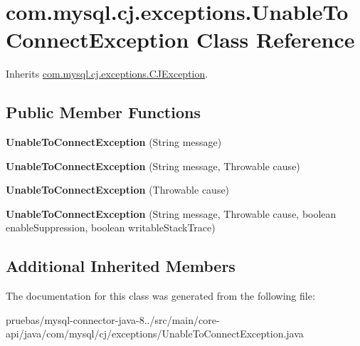 \hypertarget{classcom_1_1mysql_1_1cj_1_1exceptions_1_1_unable_to_connect_exception}{}\section{com.\+mysql.\+cj.\+exceptions.\+Unable\+To\+Connect\+Exception Class Reference}
\label{classcom_1_1mysql_1_1cj_1_1exceptions_1_1_unable_to_connect_exception}


Inherits \mbox{\hyperlink{classcom_1_1mysql_1_1cj_1_1exceptions_1_1_c_j_exception}{com.\+mysql.\+cj.\+exceptions.\+C\+J\+Exception}}.

\subsection*{Public Member Functions}
\begin{DoxyCompactItemize}
\item 
\mbox{\label{classcom_1_1mysql_1_1cj_1_1exceptions_1_1_unable_to_connect_exception_ab8e62b13382c808668c18de7e5e854df}} 
{\bfseries Unable\+To\+Connect\+Exception} (String message)
\item 
\mbox{\label{classcom_1_1mysql_1_1cj_1_1exceptions_1_1_unable_to_connect_exception_a8a28b5beb52cb2afb610d58193daaf2e}} 
{\bfseries Unable\+To\+Connect\+Exception} (String message, Throwable cause)
\item 
\mbox{\label{classcom_1_1mysql_1_1cj_1_1exceptions_1_1_unable_to_connect_exception_ad11803fe01101d0e8fc73f6f565567d4}} 
{\bfseries Unable\+To\+Connect\+Exception} (Throwable cause)
\item 
\mbox{\label{classcom_1_1mysql_1_1cj_1_1exceptions_1_1_unable_to_connect_exception_ace56ab56fc7d8fd525f564df5fed9c7c}} 
{\bfseries Unable\+To\+Connect\+Exception} (String message, Throwable cause, boolean enable\+Suppression, boolean writable\+Stack\+Trace)
\end{DoxyCompactItemize}
\subsection*{Additional Inherited Members}


The documentation for this class was generated from the following file\+:\begin{DoxyCompactItemize}
\item 
pruebas/mysql-\/connector-\/java-\/8../src/main/core-\/api/java/com/mysql/cj/exceptions/Unable\+To\+Connect\+Exception.\+java\end{DoxyCompactItemize}
